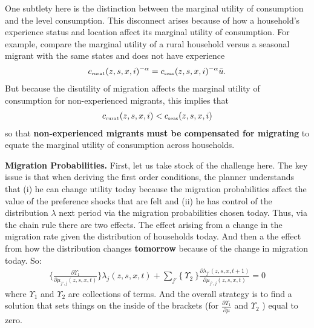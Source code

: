 \documentclass[12pt,pdftex]{article}
\begin{document}
\begin{onehalfspacing}
One subtlety here is the distinction between the marginal utility of consumption and the level consumption. This disconnect arises because of how a household's experience status and location affect its marginal utility of consumption. For example, compare the marginal utility of a rural household versus a seasonal migrant with the same states and does not have experience
\begin{align}
c_{\mbox{\tiny rura1}}(z, s, x, i)^{-\alpha} = c_{\mbox{\tiny seas}}(z, s, x, i)^{-\alpha}\bar u.
\end{align}
But because the disutility of migration affects the marginal utility of consumption for non-experienced migrants, this implies that
\begin{align}
c_{\mbox{\tiny rura1}}(z, s, x, i) < c_{\mbox{\tiny seas}}(z, s, x, i)
\end{align}
so that\textbf{ non-experienced migrants must be compensated for migrating} to equate the marginal utility of consumption across households.

\textbf{Migration Probabilities.} First, let us take stock of the challenge here. The key issue is that when deriving the first order conditions, the planner understands that (i) he can change utility today because the migration probabilities affect the value of the preference shocks that are felt and (ii) he has control of the distribution $\lambda$ next period via the migration probabilities chosen today. Thus, via the chain rule there are two effects. The effect arising from a change in the migration rate given the distribution of households today. And then a the effect from how the distribution changes \textbf{tomorrow} because of the change in migration today. So:
\begin{align}
\bigg \{ \frac{\partial  \Upsilon_1 }{\partial \mu_{j',j}(z, s, x, t)} \bigg \}\lambda_{j}(z, s, x, t) + \sum_{j'} \bigg \{ \ \Upsilon_2 \ \bigg \} \frac{\partial \lambda_{j'}(z, s, x,  t+1)}{\partial \mu_{j',j}(z, s, x, t)} = 0
\label{appendix-eq:stuff}
\end{align}
where $\Upsilon_1$ and $\Upsilon_2$ are collections of terms. And the overall strategy is to find a solution that sets things on the inside of the brackets (for $\frac{\partial \Upsilon_1}{\partial \mu}$ and $\Upsilon_2$ ) equal to zero.


\end{onehalfspacing}
\end{document}
